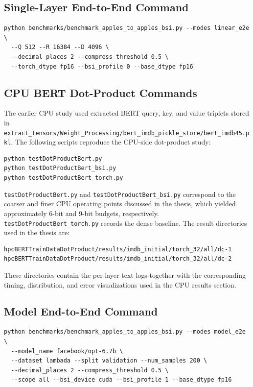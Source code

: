 \subsection{Single-Layer End-to-End Command}
\begin{lstlisting}
python benchmarks/benchmark_apples_to_apples_bsi.py --modes linear_e2e \
  --Q 512 --R 16384 --D 4096 \
  --decimal_places 2 --compress_threshold 0.5 \
  --torch_dtype fp16 --bsi_profile 0 --base_dtype fp16
\end{lstlisting}

\subsection{CPU BERT Dot-Product Commands}
The earlier CPU study used extracted BERT query, key, and value triplets stored in
\texttt{extract\_tensors/Weight\_Processing/bert\_imdb\_pickle\_store/bert\_imdb45.pkl}.
The following scripts reproduce the CPU-side dot-product study:

\begin{lstlisting}
python testDotProductBert.py
python testDotProductBert_bsi.py
python testDotProductBert_torch.py
\end{lstlisting}

\texttt{testDotProductBert.py} and \texttt{testDotProductBert\_bsi.py} correspond to the coarser and finer CPU operating points discussed in the thesis, which yielded approximately 6-bit and 9-bit budgets, respectively. \texttt{testDotProductBert\_torch.py} records the dense baseline. The result directories used in the thesis are:

\begin{lstlisting}
hpcBERTTrainDataDotProduct/results/imdb_initial/torch_32/all/dc-1
hpcBERTTrainDataDotProduct/results/imdb_initial/torch_32/all/dc-2
\end{lstlisting}

These directories contain the per-layer text logs together with the corresponding timing, distribution, and error visualizations used in the CPU results section.

\subsection{Model End-to-End Command}
\begin{lstlisting}
python benchmarks/benchmark_apples_to_apples_bsi.py --modes model_e2e \
  --model_name facebook/opt-6.7b \
  --dataset lambada --split validation --num_samples 200 \
  --decimal_places 2 --compress_threshold 0.5 \
  --scope all --bsi_device cuda --bsi_profile 1 --base_dtype fp16
\end{lstlisting}

